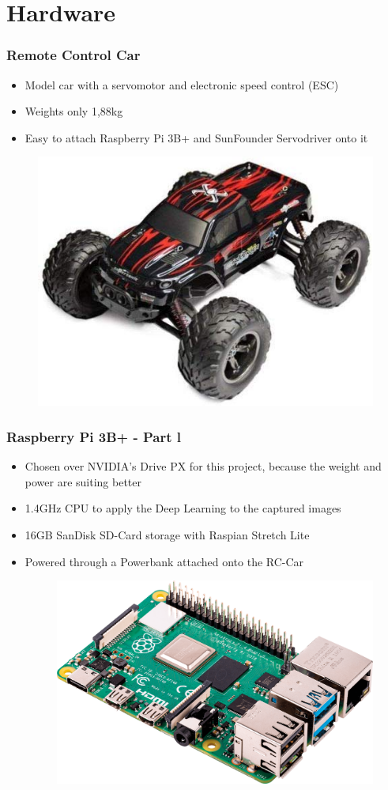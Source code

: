 \documentclass{beamer}
\begin{document}
\section{Hardware}
%
\begin{frame}
\frametitle{Remote Control Car}
\begin{itemize}
\item Model car with a servomotor and electronic speed control (ESC)
\item Weights only 1,88kg
\item Easy to attach Raspberry Pi 3B+ and SunFounder Servodriver onto it
\end{itemize}
\begin{figure}
\includegraphics[width=0.4\linewidth]{photo/car.jpg}
\end{figure}
\end{frame}
\begin{frame}
\frametitle{Raspberry Pi 3B+ - Part l}
\begin{itemize}
\item Chosen over NVIDIA's Drive PX for this project, because the weight and power are suiting  better
\item 1.4GHz CPU to apply the Deep Learning to the captured images
\item 16GB SanDisk SD-Card storage with Raspian Stretch Lite
\item Powered through a Powerbank attached onto the RC-Car
\begin{figure}
\includegraphics[width=0.4\linewidth]{photo/raspi}
\end{figure}
\end{itemize}
\end{frame}
\end{document}
